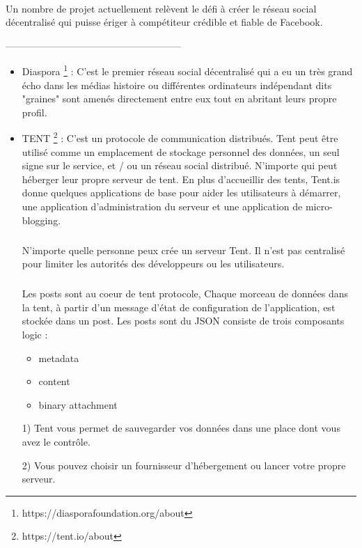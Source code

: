 \paragraph{}
Un nombre de projet actuellement relèvent le défi à créer le réseau social décentralisé qui puisse ériger à compétiteur crédible et fiable de Facebook.
  \begin{center}
------------------------------------------------------
\end{center}
\begin{itemize}
  \item Diaspora \footnote{https://diasporafoundation.org/about} : C'est le premier réseau social décentralisé qui a eu un très grand écho dans les médias histoire ou différentes ordinateurs indépendant dits "graines" sont amenés directement entre eux tout en abritant leurs propre profil.
\newline
 \item TENT \footnote{https://tent.io/about} : C'est un protocole de communication distribués. Tent peut être utilisé comme un emplacement de stockage personnel des données, un seul signe sur le service, et / ou un réseau social distribué. N'importe qui peut héberger leur propre serveur de tent. En plus d'accueillir des tents, Tent.is donne quelques applications de base pour aider les utilisateurs à démarrer, une application d'administration du serveur et une application de micro-blogging.
\subparagraph{}
N'importe quelle personne peux crée un serveur Tent. Il n'est pas centralisé pour limiter les autorités des développeurs ou les utilisateurs.
\subparagraph{}
Les posts sont au coeur de tent protocole, Chaque morceau de données dans la tent, à partir d'un message d'état de configuration de l'application, est stockée dans un post.
Les posts sont du JSON consiste de trois composants logic :
\begin{itemize}
  \item metadata 
 \item content 
 \item binary attachment
\end{itemize}

1) Tent vous permet de sauvegarder vos données dans une place dont vous avez le contrôle. 

2) Vous pouvez choisir un fournisseur d'hébergement ou lancer votre propre serveur.


\end{itemize}
